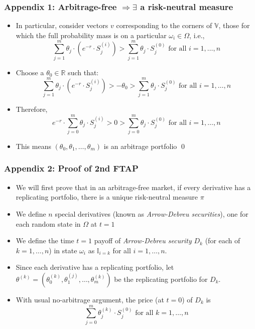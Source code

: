 \documentclass{beamer}
\begin{document}
\begin{frame}
\frametitle{Appendix 1: Arbitrage-free $\Rightarrow \exists$ a risk-neutral measure}
\begin{itemize}
\item In particular, consider vectors $v$ corresponding to the corners of $\mathbb{V}$, those for which the full probability
 mass is on a particular $\omega_i \in \Omega$, i.e.,
 $$\sum_{j=1}^m \theta_j \cdot (e^{-r} \cdot S_j^{(i)}) > \sum_{j=1}^m \theta_j \cdot S_j^{(0)} \mbox{ for all } i = 1, \ldots, n$$
 \item Choose a $\theta_0 \in \mathbb{R}$ such that:
 $$\sum_{j=1}^m \theta_j \cdot (e^{-r} \cdot S_j^{(i)}) > -\theta_0 > \sum_{j=1}^m \theta_j \cdot S_j^{(0)} \mbox{ for all } i = 1, \ldots, n$$
 \item Therefore,
 $$e^{-r} \cdot \sum_{j=0}^m \theta_j \cdot S_j^{(i)} > 0 > \sum_{j=0}^m \theta_j \cdot S_j^{(0)} \mbox{ for all } i = 1, \ldots, n$$
 \item This means $(\theta_0, \theta_1, \ldots, \theta_m)$ is an arbitrage portfolio
 \qed
\end{itemize}
\end{frame}

\appendix
\begin{frame}
\frametitle{Appendix 2: Proof of 2nd FTAP}
\begin{itemize}
\item We will first prove that in an arbitrage-free market, if every derivative has a replicating portfolio, there is a unique risk-neutral measure $\pi$
\item We define $n$ special derivatives (known as {\em Arrow-Debreu securities}), one for each random state in $\Omega$ at $t=1$
\item We define the time $t=1$ payoff of {\em Arrow-Debreu security} $D_k$ (for each of $k = 1, \ldots, n$) in state $\omega_i$ as $\mathbb{I}_{i=k}$ for all $i = 1, \ldots, n$.
\item Since each derivative has a replicating portfolio, let $\theta^{(k)} = (\theta_0^{(k)}, \theta_1^{(j)}, \ldots, \theta_m^{(k)})$ be the replicating 
portfolio for $D_k$.
\item With usual no-arbitrage argument, the price (at $t=0$) of $D_k$ is 
$$\sum_{j=0}^m \theta_j^{(k)} \cdot S_j^{(0)} \mbox{ for all } k = 1, \ldots, n$$
\end{itemize}
\end{frame}
\end{document}
